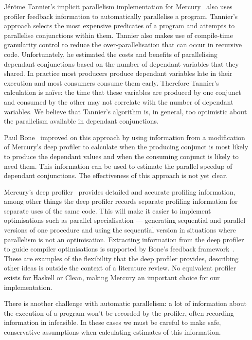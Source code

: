 J\'er\"ome Tannier's implicit parallelism implementation for
Mercury~\cite{tannier} also uses profiler feedback information to
automatically parallelise a program.
Tannier's approach selects the most expensive predicates of a program
and attempts to parallelise conjunctions within them.
Tannier also makes use of compile-time granularity
control to reduce the over-parallelisation that can occur in recursive
code.
Unfortunately, he estimated the costs and benefits of parallelising
dependant conjunctions based on the number of dependant variables that
they shared.
In practice most producers produce dependant variables late in their
execution and most consumers consume them early.
Therefore Tannier's calculation is na\"ive: the time that these
variables are produced by one conjunct and consumed by the other may
not correlate with the number of dependant variables.
We believe that Tannier's algorithm is, in general, too optimistic
about the parallelism available in dependant conjunctions.

Paul Bone~\cite{bone:2008:hons} improved on this approach by using
information from a modification of Mercury's deep profiler to
calculate when the producing conjunct is most likely to produce the
dependant values and when the consuming conjunct is likely to need
them.
This information can be used to estimate the parallel speedup of
dependant conjunctions.
The effectiveness of this approach is not yet clear.

Mercury's deep profiler~\cite{conway:2001:mercury-deep} provides
detailed and accurate profiling information,
among other things the deep profiler records separate profiling
information for separate uses of the same code.
This will make it easier to implement optimisations such as
parallel specialisation --- generating sequential and parallel
versions of one procedure and using the sequential version
in situations where parallelism is not an optimisation.
Extracting information from the deep profiler to guide compiler
optimisations is supported by Bone's feedback
framework~\cite{bone:2008:hons}.
These are examples of the flexibility that the deep profiler provides,
describing other ideas is outside the context of a literature review.
No equivalent profiler exists for Haskell or Clean, making Mercury an
important choice for our implementation.

There is another challenge with automatic parallelism: a lot of
information about the execution of a program won't be recorded by the
profiler, often recording information in infeasible.
In these cases we must be careful to make safe, conservative
assumptions when calculating estimates of this information.

